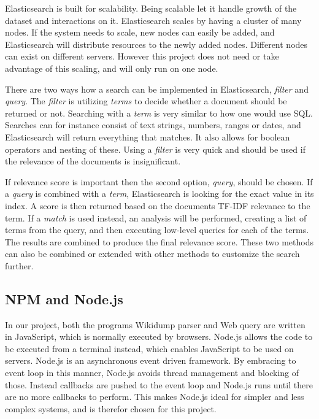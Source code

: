 Elasticsearch is built for scalability. Being scalable let it handle growth of the dataset and interactions on it. Elasticsearch scales by having a cluster of many nodes. If the system needs to scale, new nodes can easily be added, and Elasticsearch will distribute resources to the newly added nodes. Different nodes can exist on different servers. However this project does not need or take advantage of this scaling, and will only run on one node.

There are two ways how a search can be implemented in Elasticsearch, \textit{filter} and \textit{query}. The \textit{filter} is utilizing \textit{terms} to decide whether a document should be returned or not. Searching with a \textit{term} is very similar to how one would use SQL. 
Searches can for instance consist of text strings, numbers, ranges or dates, and Elasticsearch will return everything that matches. It also allows for boolean operators and nesting of these. Using a \textit{filter} is very quick and should be used if the relevance of the documents is insignificant.

If relevance score is important then the second option, \textit{query}, should be chosen. If a \textit{query} is combined with a \textit{term}, Elasticsearch is looking for the exact value in its index. A score is then returned based on the documents TF-IDF relevance to the term. If a \textit{match} is used instead, an analysis will be performed, creating a list of terms from the query, and then executing low-level queries for each of the terms. The results are combined to produce the final relevance score. These two methods can also be combined or extended with other methods to customize the search further.


\subsection{NPM and Node.js}
In our project, both the programs Wikidump parser and Web query are written in JavaScript, which is normally executed by browsers. Node.js\cite{node} allows the code to be executed from a terminal instead, which enables JavaScript to be used on servers.  Node.js is an asynchronous event driven framework. By embracing to event loop in this manner, Node.js avoids thread management and blocking of those. Instead callbacks are pushed to the event loop and Node.js runs until there are no more callbacks to perform. This makes Node.js ideal for simpler and less complex systems, and is therefor chosen for this project.

